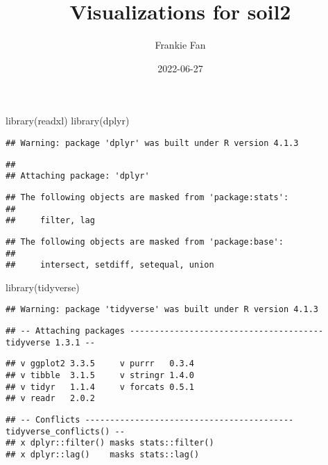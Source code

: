 \documentclass[
]{article}
\title{Visualizations for soil2}
\author{Frankie Fan}
\date{2022-06-27}
\newenvironment{Shaded}{\begin{snugshade}}{\end{snugshade}}
\newcommand{\FunctionTok}[1]{\textcolor[rgb]{0.00,0.00,0.00}{#1}}
\newcommand{\NormalTok}[1]{#1}
\begin{document}
\maketitle

\begin{Shaded}
\begin{Highlighting}[]
\FunctionTok{library}\NormalTok{(readxl)}
\FunctionTok{library}\NormalTok{(dplyr)}
\end{Highlighting}
\end{Shaded}

\begin{verbatim}
## Warning: package 'dplyr' was built under R version 4.1.3
\end{verbatim}

\begin{verbatim}
## 
## Attaching package: 'dplyr'
\end{verbatim}

\begin{verbatim}
## The following objects are masked from 'package:stats':
## 
##     filter, lag
\end{verbatim}

\begin{verbatim}
## The following objects are masked from 'package:base':
## 
##     intersect, setdiff, setequal, union
\end{verbatim}

\begin{Shaded}
\begin{Highlighting}[]
\FunctionTok{library}\NormalTok{(tidyverse)}
\end{Highlighting}
\end{Shaded}

\begin{verbatim}
## Warning: package 'tidyverse' was built under R version 4.1.3
\end{verbatim}

\begin{verbatim}
## -- Attaching packages --------------------------------------- tidyverse 1.3.1 --
\end{verbatim}

\begin{verbatim}
## v ggplot2 3.3.5     v purrr   0.3.4
## v tibble  3.1.5     v stringr 1.4.0
## v tidyr   1.1.4     v forcats 0.5.1
## v readr   2.0.2
\end{verbatim}

\begin{verbatim}
## -- Conflicts ------------------------------------------ tidyverse_conflicts() --
## x dplyr::filter() masks stats::filter()
## x dplyr::lag()    masks stats::lag()
\end{verbatim}
\end{document}
